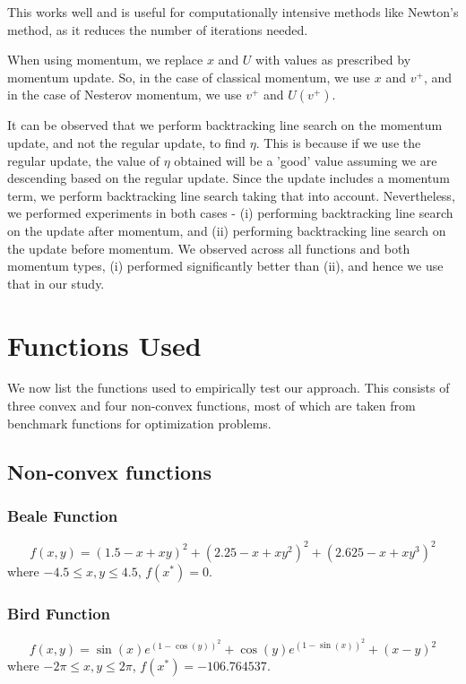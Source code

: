 \documentclass{article}
\begin{document}
This works well and is useful for computationally intensive methods like Newton's method, as it reduces the number of iterations needed.

When using momentum, we replace $x$ and $U$ with values as prescribed by momentum update. So, in the case of classical momentum, we use $x$ and $v^+$, and in the case of Nesterov momentum, we use $v^+$ and $U(v^+)$.

It can be observed that we perform backtracking line search on the momentum update, and not the regular update, to find $\eta$. This is because if we use the regular update, the value of $\eta$ obtained will be a 'good' value assuming we are descending based on the regular update. Since the update includes a momentum term, we perform backtracking line search taking that into account. Nevertheless, we performed experiments in both cases - (i) performing backtracking line search on the update after momentum, and (ii) performing backtracking line search on the update before momentum. We observed across all functions and both momentum types, (i) performed significantly better than (ii), and hence we use that in our study.

\section{Functions Used}\label{functions}
We now list the functions used to empirically test our approach. This consists of three convex and four non-convex functions, most of which are taken from benchmark functions for optimization problems.

\subsection{Non-convex functions}

\subsubsection{Beale Function}
\begin{equation}
f(x,y) = (1.5 - x + xy)^2 + (2.25 - x + xy^2)^2 + (2.625 - x + xy^3)^2	
\end{equation}
where $-4.5\le x,y \le 4.5$, $f(x^*)=0$.

\subsubsection{Bird Function}
\begin{equation}
f(x,y) = \sin(x)e^{(1-\cos(y))^2} + \cos(y)e^{(1-\sin(x))^2} + (x-y)^2
\end{equation}
where $-2\pi \le x,y \le 2\pi$, $f(x^*)=-106.764537$.
\end{document}
